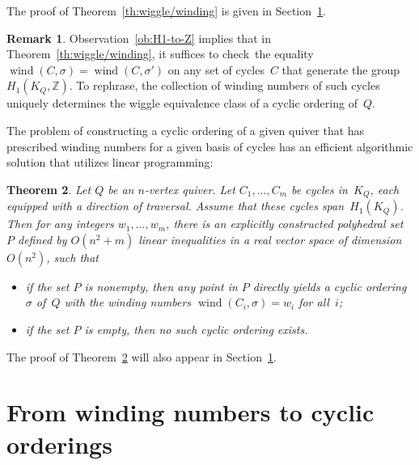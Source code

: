 \documentclass[11pt, letterpaper]{amsart}
\newtheorem{theorem}{Theorem}[section]
\theoremstyle{definition}
\newtheorem{remark}[theorem]{Remark}
\numberwithin{equation}{section}
\def\ZZ{{\mathbb Z}}
\def\wind{{\operatorname{wind}}}
\newcommand\GQ{K_Q}
\begin{document}

The proof of Theorem~\ref{th:wiggle/winding} is given in Section~\ref{sec:proof-wiggle/winding}. 

\begin{remark}
\label{rem:homotopy gen invariant}
Observation~\ref{ob:H1-to-Z} implies that 
in Theorem~\ref{th:wiggle/winding}, 
it suffices to check~the equality $\wind(C,\sigma)=\wind(C,\sigma')$ 
on any set of cycles~$C$ that generate the group $H_1(\GQ,\ZZ)$.
To rephrase, the collection of winding numbers of such cycles 
uniquely determines the wiggle equivalence class of a cyclic ordering of~$Q$. 
\end{remark}


The problem of constructing a cyclic ordering of a given quiver that has prescribed winding numbers
for a given basis of cycles has an efficient algorithmic solution that utilizes linear programming: 

\newcommand\LPT{P}

\begin{theorem}
\label{thm:construct an ordering}
Let $Q$ be an $n$-vertex quiver.
Let $C_1, \ldots, C_m$ be cycles in~$\GQ$, each equipped with a direction of traversal.
Assume that these cycles span~$H_1(\GQ)$. 
Then for any integers $w_1, \ldots, w_m$, 
there is an explicitly constructed polyhedral set $\LPT$ 
defined by $O(n^2+m)$ linear inequalities in a real vector space of dimension~$O(n^2)$, such that
\begin{itemize}[leftmargin=.2in]
\item 
if the set $\LPT$ is nonempty, then any point in $\LPT$ directly yields 
a cyclic ordering $\sigma$ of~$Q$ with the winding numbers $\wind(C_i, \sigma) = w_i$ for all~$i$; 
\item
if the set $\LPT$ is empty, then no such cyclic ordering exists.
\end{itemize}
\end{theorem}

The proof of Theorem~\ref{thm:construct an ordering} will also appear in Section~\ref{sec:proof-wiggle/winding}.

\newpage

\section{From winding numbers to cyclic orderings
}
\label{sec:proof-wiggle/winding}
\end{document}
